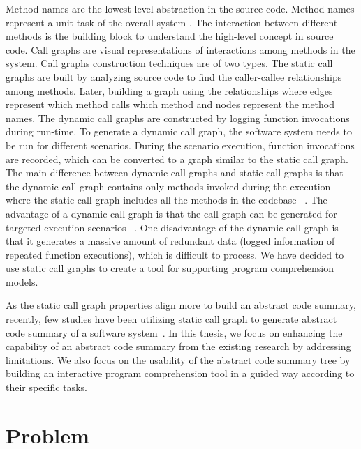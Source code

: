 Method names are the lowest level abstraction in the source code. Method names represent a unit task of the overall system \cite{de2012IRMethodsArtifacts, starke2009searching}. The interaction between different methods is the building block to understand the high-level concept in source code. Call graphs are visual representations of interactions among methods in the system. Call graphs construction techniques are of two types. The static call graphs are built by analyzing source code to find the caller-callee relationships among methods. Later, building a graph using the relationships where edges represent which method calls which method and nodes represent the method names. The dynamic call graphs are constructed by logging function invocations during run-time. To generate a dynamic call graph, the software system needs to be run for different scenarios. During the scenario execution, function invocations are recorded, which can be converted to a graph similar to the static call graph. The main difference between dynamic call graphs and static call graphs is that the dynamic call graph contains only methods invoked during the execution where the static call graph includes all the methods in the codebase ~\cite{gharibi2018automaticStaticCluster}. The advantage of a dynamic call graph is that the call graph can be generated for targeted execution scenarios ~\cite{feng2018hierarchicalExecutionComprehension}. One disadvantage of the dynamic call graph is that it generates a massive amount of redundant data (logged information of repeated function executions), which is difficult to process. We have decided to use static call graphs to create a tool for supporting program comprehension models. 

As the static call graph properties align more to build an abstract code summary, recently, few studies have been utilizing static call graph to generate abstract code summary of a software system~\cite{gharibi2018automaticStaticCluster, walunj2019graphevoEvolutionCall}. In this thesis, we focus on enhancing the capability of an abstract code summary from the existing research by addressing limitations. We also focus on the usability of the abstract code summary tree by building an interactive program comprehension tool
in a guided way according to their specific tasks. 
 
\newpage


\section{Problem }
\label{intro:problem}
